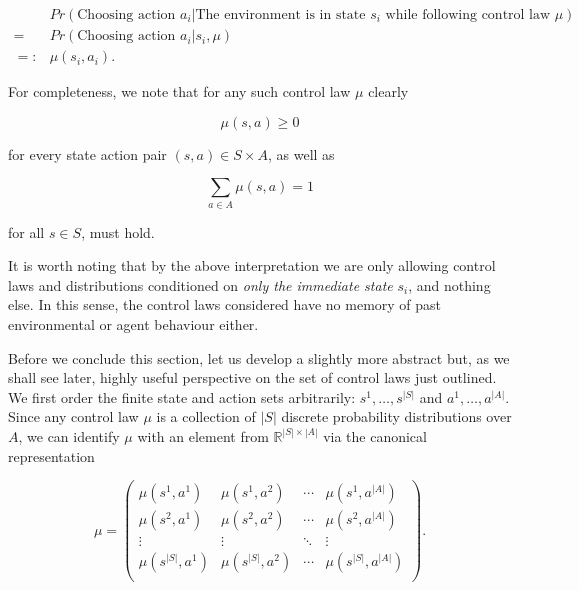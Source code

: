 \documentclass[11pt]{article} %
\begin{document}
\begin{equation}\label{controlProb}
	\begin{array}{ll}
			& 	Pr(\text{Choosing action }a_i | \text{The environment is in state } s_i \text{ while following control law }\mu) \\
		=	&	Pr(\text{Choosing action }a_i | s_i, \mu) \\
		=:	&	\mu(s_i, a_i).
	\end{array}
\end{equation}

For completeness, we note that for any such control law $\mu$ clearly 

\begin{equation}\label{controlProbPositive}
	\mu(s,a) \ge 0
\end{equation}

 for every state action pair $(s,a) \in S \times A$, as well as 

\begin{equation}\label{controlProbSum1}
	\sum_{a \in A} \mu(s,a) = 1
\end{equation}

for all $s \in S$, must hold. 

It is worth noting that by the above interpretation we are only allowing control laws and distributions conditioned on \textit{only the immediate state} $s_i$, and nothing else. In this sense, the control laws considered have no memory of past environmental or agent behaviour either.

Before we conclude this section, let us develop a slightly more abstract but, as we shall see later, highly useful perspective on the set of control laws just outlined. We first order the finite state and action sets arbitrarily: $s^1,\dots,s^{|S|}$ and $a^1,\dots,a^{|A|}$. Since any control law $\mu$ is a collection of $|S|$ discrete probability distributions over $A$, we can identify $\mu$ with an element from $\mathbb{R}^{|S| \times |A|}$ via the canonical representation

\begin{equation}\label{controlProbMatrix}
	\mu = \left(	\begin{array}{cccc}
					\mu(s^1,a^1)	&	\mu(s^1,a^2)	&	\cdots 	&	\mu(s^1,a^{|A|}) \\
					\mu(s^2,a^1)	&	\mu(s^2,a^2)	&	\cdots 	&	\mu(s^2,a^{|A|}) \\
					\vdots 		&	\vdots 		& 	\ddots 	& 	\vdots \\
					\mu(s^{|S|},a^1)	&	\mu(s^{|S|},a^2)	&	\cdots 	&	\mu(s^{|S|},a^{|A|}) \\
				\end{array}
		\right).
\end{equation}
\end{document}
